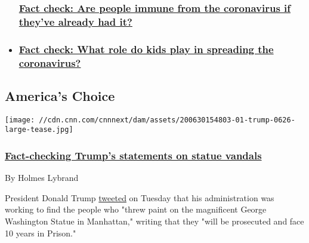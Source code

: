 \begin{itemize}
{  \subsubsection{\texorpdfstring{\href{/2020/07/20/politics/coronavirus-immunity-fact-check/index.html}{Fact
  check: Are people immune from the coronavirus if they've already had
  it?}}{Fact check: Are people immune from the coronavirus if they've already had it?}}\label{fact-check-are-people-immune-from-the-coronavirus-if-theyve-already-had-it}}
\item
  \hypertarget{fact-check-what-role-do-kids-play-in-spreading-the-coronavirus-}{%
  \subsubsection{\texorpdfstring{\href{/2020/07/10/politics/do-kids-spread-coronavirus-fact-check/index.html}{Fact
  check: What role do kids play in spreading the coronavirus?
  }}{Fact check: What role do kids play in spreading the coronavirus? }}\label{fact-check-what-role-do-kids-play-in-spreading-the-coronavirus-}}
\end{itemize}

\hypertarget{americas-choice-}{%
\subsection{America's Choice~}\label{americas-choice-}}

\href{/2020/06/30/politics/donald-trump-vandals-statues-prison-fact-check/index.html}{}

\texttt{[image: //cdn.cnn.com/cnnnext/dam/assets/200630154803-01-trump-0626-large-tease.jpg]}

\hypertarget{fact-checking-trumps-statements-on-statue-vandals}{%
\subsubsection{\texorpdfstring{\href{/2020/06/30/politics/donald-trump-vandals-statues-prison-fact-check/index.html}{Fact-checking
Trump's statements on statue
vandals}}{Fact-checking Trump's statements on statue vandals}}\label{fact-checking-trumps-statements-on-statue-vandals}}

By Holmes Lybrand

President Donald Trump
\href{https://twitter.com/realDonaldTrump/status/1277954189008744448}{tweeted}
on Tuesday that his administration was working to find the people who
"threw paint on the magnificent George Washington Statue in Manhattan,"
writing that they "will be prosecuted and face 10 years in Prison."


